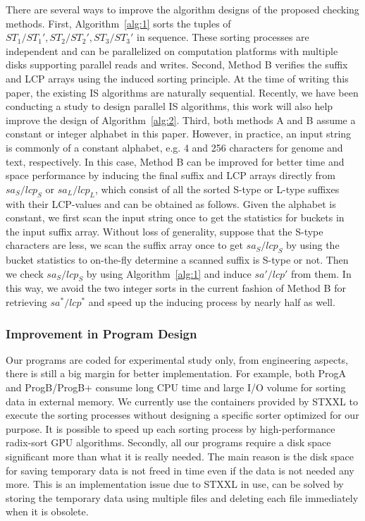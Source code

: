 \documentclass[10pt,journal,compsoc]{IEEEtran}
\begin{document}
There are several ways to improve the algorithm designs of the proposed checking methods. First, Algorithm~\ref{alg:1} sorts the tuples of $ST_1/ST_1', ST_2/ST_2', ST_3/ST_3'$ in sequence. These sorting processes are independent and can be parallelized on computation platforms with multiple disks supporting parallel reads and writes. Second, Method B verifies the suffix and LCP arrays using the induced sorting principle. At the time of writing this paper, the existing IS algorithms are naturally sequential. Recently, we have been conducting a study to design parallel IS algorithms, this work will also help improve the design of Algorithm~\ref{alg:2}. Third, both methods A and B assume a constant or integer alphabet in this paper. However, in practice, an input string is commonly of a constant alphabet, e.g. 4 and 256 characters for genome and text, respectively. In this case, Method B can be improved for better time and space performance by inducing the final suffix and LCP arrays directly from $sa_S/lcp_S$ or $sa_L/lcp_L$, which consist of all the sorted S-type or L-type suffixes with their LCP-values and can be obtained as follows. Given the alphabet is constant, we first scan the input string once to get the statistics for buckets in the input suffix array. Without loss of generality, suppose that the S-type characters are less, we scan the suffix array once to get $sa_S/lcp_S$ by using the bucket statistics to on-the-fly determine a scanned suffix is S-type or not. Then we check $sa_S/lcp_S$ by using Algorithm~\ref{alg:1} and induce $sa'/lcp'$ from them. In this way, we avoid the two integer sorts in the current fashion of Method B for retrieving $sa^*/lcp^*$ and speed up the inducing process by nearly half as well.

\subsubsection{Improvement in Program Design} \label{sec:experiments:discussion:improve_program_design}

Our programs are coded for experimental study only, from engineering aspects, there is still a big margin for better implementation. For example, both ProgA and ProgB/ProgB+ consume long CPU time and large I/O volume for sorting data in external memory. We currently use the containers provided by STXXL to execute the sorting processes without designing a specific sorter optimized for our purpose. It is possible to speed up each sorting process by high-performance radix-sort GPU algorithms. Secondly, all our programs require a disk space significant more than what it is really needed. The main reason is the disk space for saving temporary data is not freed in time even if the data is not needed any more. This is an implementation issue due to STXXL in use, can be solved by storing the temporary data using multiple files and deleting each file immediately when it is obsolete. 
	
\end{document}
